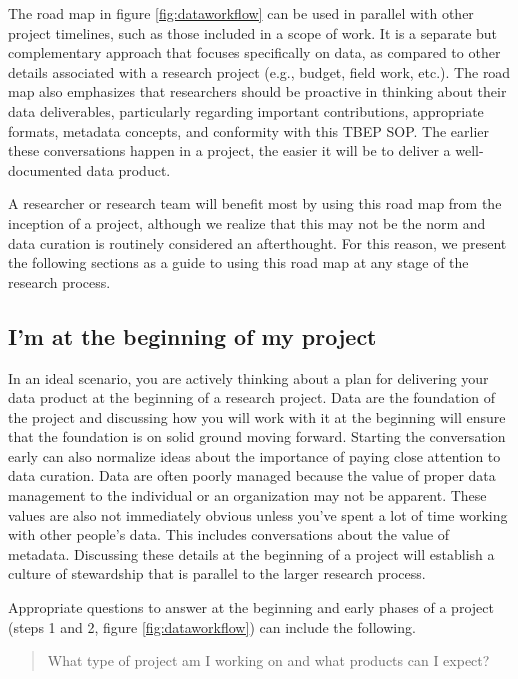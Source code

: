 \documentclass[
]{book}
\begin{document}
The road map in figure \ref{fig:dataworkflow} can be used in parallel with other project timelines, such as those included in a scope of work. It is a separate but complementary approach that focuses specifically on data, as compared to other details associated with a research project (e.g., budget, field work, etc.). The road map also emphasizes that researchers should be proactive in thinking about their data deliverables, particularly regarding important contributions, appropriate formats, metadata concepts, and conformity with this TBEP SOP. The earlier these conversations happen in a project, the easier it will be to deliver a well-documented data product.

A researcher or research team will benefit most by using this road map from the inception of a project, although we realize that this may not be the norm and data curation is routinely considered an afterthought. For this reason, we present the following sections as a guide to using this road map at any stage of the research process.

\hypertarget{beginning}{%
\subsection{I'm at the beginning of my project}\label{beginning}}

In an ideal scenario, you are actively thinking about a plan for delivering your data product at the beginning of a research project. Data are the foundation of the project and discussing how you will work with it at the beginning will ensure that the foundation is on solid ground moving forward. Starting the conversation early can also normalize ideas about the importance of paying close attention to data curation. Data are often poorly managed because the value of proper data management to the individual or an organization may not be apparent. These values are also not immediately obvious unless you've spent a lot of time working with other people's data. This includes conversations about the value of metadata. Discussing these details at the beginning of a project will establish a culture of stewardship that is parallel to the larger research process.

Appropriate questions to answer at the beginning and early phases of a project (steps 1 and 2, figure \ref{fig:dataworkflow}) can include the following.

\begin{quote}
What type of project am I working on and what products can I expect?
\end{quote}
\end{document}
